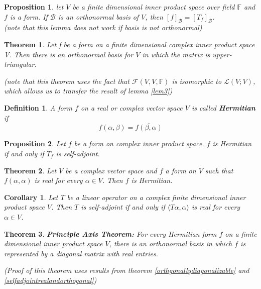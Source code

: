 \documentclass{article}
\newcommand{\innerproduct}[1]{\langle#1\rangle}
\newtheorem{theorem}{Theorem}[section]
\newtheorem{definition}{Definition}[section]
\newtheorem{proposition}{Proposition}[section]
\newtheorem{corollary}{Corollary}[theorem]
\numberwithin{theorem}{subsection} %
\numberwithin{definition}{subsection} %
\numberwithin{proposition}{subsection} %
\begin{document}
\begin{proposition} let $V$ be a finite dimensional inner product space over field $\mathbb{F}$
    and $f$ is a form. If $\mathcal{B}$ is an orthonormal basis of $V$, then $[f]_\mathcal{B}
    = [T_f]_\mathcal{B}$. \\
    (note that this lemma does not work if basis is not orthonormal)
\end{proposition}

\begin{theorem}
    Let f be a form on a finite dimensional complex inner product space V. Then there is
    an orthonormal basis for $V$ in which the matrix is upper-triangular. 

    (note that this theorem uses the fact that $\mathcal{F}(V,V,\mathbb{F})$ is isomorphic
    to $\mathcal{L}(V;V)$, which allows us to transfer the result of lemma \ref{lem3})
\end{theorem}


\begin{definition}
    A form $f$ on a real or complex vector space $V$ is called \textbf{Hermitian} if 
    \begin{equation*}
        f(\alpha,\beta) = \overline{f(\beta, \alpha)}
    \end{equation*}
\end{definition}

\begin{proposition}
    Let $f$ be a form on complex inner product space. $f$ is Hermitian if and only if $T_f$ is
    self-adjoint.
\end{proposition}

\begin{theorem}
    Let $V$ be a complex vector space and $f$ a form on $V$ such that $f(\alpha, \alpha)$
    is real for every $\alpha \in V$. Then $f$ is Hermitian.
\end{theorem}

\begin{corollary}
    Let $T$ be a linear operator on a complex finite dimensional inner product space $V$.
    Then $T$ is self-adjoint if and only if $\innerproduct{T\alpha, \alpha}$ is real for
    every $\alpha \in V$.
\end{corollary}

\begin{theorem}
    \textbf{Principle Axis Theorem: }
    For every Hermitian form $f$ on a finite dimensional inner product space $V$, there is
    an orthonormal basis in which $f$ is represented by a diagonal matrix with real
    entries.

    (Proof of this theorem uses results from theorem \ref{orthgonallydiagonalizable} and
    \ref{selfadjointrealandorthogonal})
\end{theorem}
\end{document}

